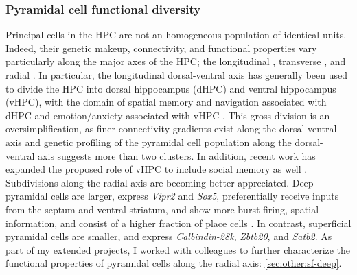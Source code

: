 \subsubsection{Pyramidal cell functional diversity}
Principal cells in the \ac{HPC} are not an homogeneous population of identical units.
Indeed, their genetic makeup, connectivity, and functional properties vary particularly along the major axes of the \ac{HPC}; the longitudinal \citep{Strange2014}, transverse \citep{Igarashi2014}, and radial \citep{Slomianka2011}.
In particular, the longitudinal dorsal-ventral axis has generally been used to divide the \ac{HPC} into dorsal hippocampus (dHPC) and ventral hippocampus (vHPC), with the domain of spatial memory and navigation associated with dHPC and emotion/anxiety associated with vHPC \citep{Strange2014}.
This gross division is an oversimplification, as finer connectivity gradients exist along the dorsal-ventral axis and genetic profiling of the pyramidal cell population along the dorsal-ventral axis suggests more than two clusters.
In addition, recent work has expanded the proposed role of vHPC to include social memory as well \citep{Okuyama2016}.
Subdivisions along the radial axis are becoming better appreciated.
Deep pyramidal cells are larger, express \emph{Vipr2} and \emph{Sox5}, preferentially receive inputs from the septum and ventral striatum, and show more burst firing, spatial information, and consist of a higher fraction of place cells \citep{XXX}.
In contrast, superficial pyramidal cells are smaller, and express \emph{Calbindin-28k}, \emph{Zbtb20}, and \emph{Satb2}.
As part of my extended projects, I worked with colleagues to further characterize the functional properties of pyramidal cells along the radial axis: \autoref{sec:other:sf-deep}.

